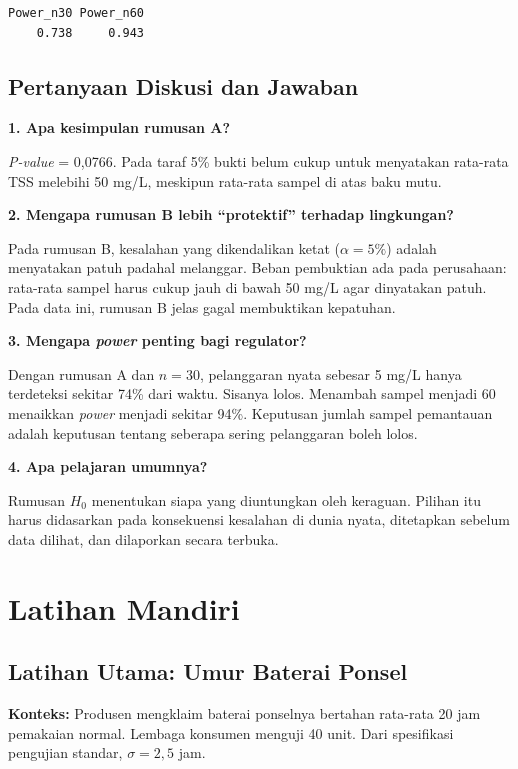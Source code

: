 \documentclass[
  indonesian,
  letterpaper,
]{book}
\begin{document}
\begin{verbatim}
Power_n30 Power_n60 
    0.738     0.943 
\end{verbatim}

\subsection{Pertanyaan Diskusi dan
Jawaban}\label{pertanyaan-diskusi-dan-jawaban-1}

\textbf{1. Apa kesimpulan rumusan A?}

\emph{P-value} = 0,0766. Pada taraf 5\% bukti belum cukup untuk
menyatakan rata-rata TSS melebihi 50 mg/L, meskipun rata-rata sampel di
atas baku mutu.

\textbf{2. Mengapa rumusan B lebih ``protektif'' terhadap lingkungan?}

Pada rumusan B, kesalahan yang dikendalikan ketat (\(\alpha = 5\%\))
adalah menyatakan patuh padahal melanggar. Beban pembuktian ada pada
perusahaan: rata-rata sampel harus cukup jauh di bawah 50 mg/L agar
dinyatakan patuh. Pada data ini, rumusan B jelas gagal membuktikan
kepatuhan.

\textbf{3. Mengapa \emph{power} penting bagi regulator?}

Dengan rumusan A dan \(n = 30\), pelanggaran nyata sebesar 5 mg/L hanya
terdeteksi sekitar 74\% dari waktu. Sisanya lolos. Menambah sampel
menjadi 60 menaikkan \emph{power} menjadi sekitar 94\%. Keputusan jumlah
sampel pemantauan adalah keputusan tentang seberapa sering pelanggaran
boleh lolos.

\textbf{4. Apa pelajaran umumnya?}

Rumusan \(H_0\) menentukan siapa yang diuntungkan oleh keraguan. Pilihan
itu harus didasarkan pada konsekuensi kesalahan di dunia nyata,
ditetapkan sebelum data dilihat, dan dilaporkan secara terbuka.

\section{Latihan Mandiri}\label{latihan-mandiri-1}

\subsection{Latihan Utama: Umur Baterai
Ponsel}\label{latihan-utama-umur-baterai-ponsel}

\textbf{Konteks:} Produsen mengklaim baterai ponselnya bertahan
rata-rata 20 jam pemakaian normal. Lembaga konsumen menguji 40 unit.
Dari spesifikasi pengujian standar, \(\sigma = 2{,}5\) jam.
\end{document}
